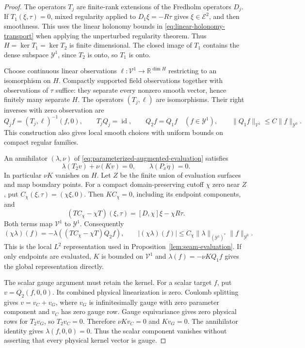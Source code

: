 \documentclass[11pt]{amsart}
\theoremstyle{definition}
\theoremstyle{remark}
\theoremstyle{plain}
\newcommand{\RR}{\mathbb{R}}
\newcommand{\id}{\operatorname{id}}
\begin{document}
\begin{proof}
The operators $T_j$ are finite-rank extensions of the Fredholm
operators $D_j$. If $T_1(\xi,\tau)=0$, mixed regularity applied
to $D_1\xi=-R\tau$ gives $\xi\in\mathcal E^2$, and then
smoothness. This uses the linear holonomy bounds in
\eqref{eq:linear-holonomy-transport} when applying the
unperturbed regularity theorem. Thus
$H=\ker T_1=\ker T_2$ is finite dimensional. The closed image
of $T_1$ contains the dense subspace $\mathcal Y^1$, since
$T_2$ is onto, so $T_1$ is onto.

Choose continuous linear observations
$\ell:\mathcal V^1\to\RR^{\dim H}$ restricting to an
isomorphism on $H$. Compactly supported field observations
together with observations of $\tau$ suffice: they separate
every nonzero smooth vector, hence finitely many separate $H$.
The operators $(T_j,\ell)$ are isomorphisms. Their right
inverses with zero observation are
\begin{equation}\label{eq:compatible-parameterized-inverses}
 Q_jf=(T_j,\ell)^{-1}(f,0),\qquad
 T_jQ_j=\id,\qquad
 Q_2f=Q_1f\quad(f\in\mathcal Y^1),\qquad
 \|Q_1f\|_{\mathcal V^1}\leq C\|f\|_{\mathcal Y^0}.
\end{equation}
This construction also gives local smooth choices with uniform
bounds on compact regular families.

An annihilator $(\lambda,\nu)$ of
\eqref{eq:parameterized-augmented-evaluation} satisfies
\[
 \lambda(T_2v)+\nu(Kv)=0,\qquad
 \lambda(P_x\dot\eta)=0.
\]
In particular $\nu K$ vanishes on $H$. Let $Z$ be the finite
union of evaluation surfaces and map boundary points.
For a compact domain-preserving cutoff $\chi$ zero near $Z$,
put $C_\chi(\xi,\tau)=(\chi\xi,0)$. Then $KC_\chi=0$,
including its endpoint components, and
\begin{equation}\label{eq:parameterized-cutoff-commutator}
 (TC_\chi-\chi T)(\xi,\tau)
             =[D,\chi]\xi-\chi R\tau .
\end{equation}
Both terms map $\mathcal V^1$ to $\mathcal Y^1$.
Consequently
\[
 (\chi\lambda)(f)
       =-\lambda((TC_\chi-\chi T)Q_2f),\qquad
 |(\chi\lambda)(f)|\leq C_\chi
      \|\lambda\|_{(\mathcal Y^1)^*}\|f\|_{\mathcal Y^0}.
\]
This is the local $L^2$ representation used in
Proposition~\ref{lem:seam-evaluation}. If only endpoints
are evaluated, $K$ is bounded on $\mathcal V^1$ and
$\lambda(f)=-\nu KQ_1f$ gives the global representation directly.

The scalar gauge argument must retain the kernel. For a scalar
target $f$, put $v=Q_2(f,0,0)$. Its combined physical
linearization is zero. Coulomb splitting gives
$v=v_C+v_G$, where $v_G$ is infinitesimally gauge with zero
parameter component and $v_C$ has zero gauge row.
Gauge equivariance gives zero physical rows for $T_2v_G$,
so $T_2v_C=0$. Therefore $\nu Kv_C=0$ and $Kv_G=0$.
The annihilator identity gives $\lambda(f,0,0)=0$.
Thus the scalar component vanishes without asserting that
every physical kernel vector is gauge.


\end{proof}
\end{document}
